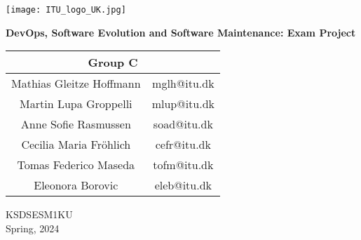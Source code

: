\begin{titlepage}
        \vspace*{-7em}
        \hbox{\hspace{14em}\texttt{[image: ITU\_logo\_UK.jpg]}}
        \vspace*{4em}
    \begin{center}
        \centering 
        \vspace*{0.5cm}
        \LARGE
        \textbf{DevOps, Software Evolution and Software Maintenance: Exam Project}

        \vspace{1.5cm}
        
        \large
        \begin{center}
        \begin{tabular}{ |c|c| } 
        \hline
        \multicolumn{2}{|c|}{Group C}\\
        [0.5em]
        \hline
        Mathias Gleitze Hoffmann & mglh@itu.dk \\ 
        Martin Lupa Groppelli & mlup@itu.dk \\ 
        Anne Sofie Rasmussen & soad@itu.dk \\ 
        Cecilia Maria Fröhlich & cefr@itu.dk \\ 
        Tomas Federico Maseda & tofm@itu.dk \\ 
        Eleonora Borovic & eleb@itu.dk \\ 
        \hline
        \end{tabular}
        \end{center}
         
        \vspace{0.5cm}
        

        \vfill

        
        KSDSESM1KU\\
        Spring, 2024
             
    \end{center}
\end{titlepage}